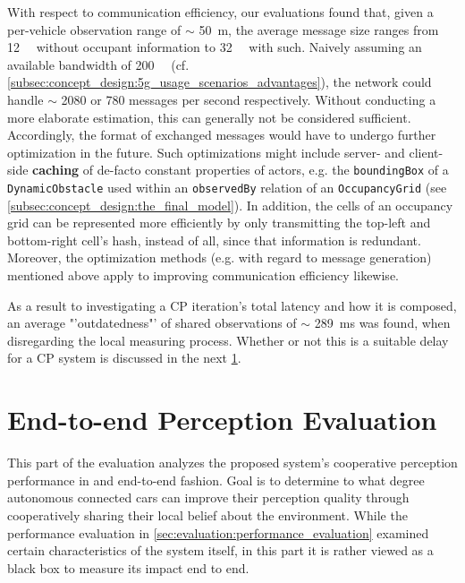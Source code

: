 With respect to communication efficiency, our evaluations found that, given a per-vehicle observation range of $\sim$ \SI{50}{\meter}, the average message size ranges from \SI{12}{\kilo\byte} without occupant information to \SI{32}{\kilo\byte} with such. Naively assuming an available bandwidth of \SI{200}{\mega\bit} (cf. \cref{subsec:concept_design:5g_usage_scenarios_advantages}), the network could handle $\sim$ 2080 or 780 messages per second respectively. Without conducting a more elaborate estimation, this can generally not be considered sufficient. Accordingly, the format of exchanged messages would have to undergo further optimization in the future. Such optimizations might include server- and client-side \textbf{caching} of de-facto constant properties of actors, e.g. the \texttt{boundingBox} of a \texttt{DynamicObstacle} used within an \texttt{observedBy} relation of an \texttt{OccupancyGrid} (see \cref{subsec:concept_design:the_final_model}). In addition, the cells of an occupancy grid can be represented more efficiently by only transmitting the top-left and bottom-right cell's hash, instead of all, since that information is redundant. Moreover, the optimization methods (e.g. with regard to message generation) mentioned above apply to improving communication efficiency likewise.

As a result to investigating a CP iteration's total latency and how it is composed, an average "'outdatedness"' of shared observations of $\sim$ \SI{289}{\milli\second} was found, when disregarding the local measuring process. Whether or not this is a suitable delay for a CP system is discussed in the next \cref{sec:evaluation:perception_evaluation}.

\section{End-to-end Perception Evaluation}
\label{sec:evaluation:perception_evaluation}
This part of the evaluation analyzes the proposed system's cooperative perception performance in and end-to-end fashion. Goal is to determine to what degree autonomous connected cars can improve their perception quality through cooperatively sharing their local belief about the environment. While the performance evaluation in \cref{sec:evaluation:performance_evaluation} examined certain characteristics of the system itself, in this part it is rather viewed as a black box to measure its impact end to end. 
\par
\bigskip


